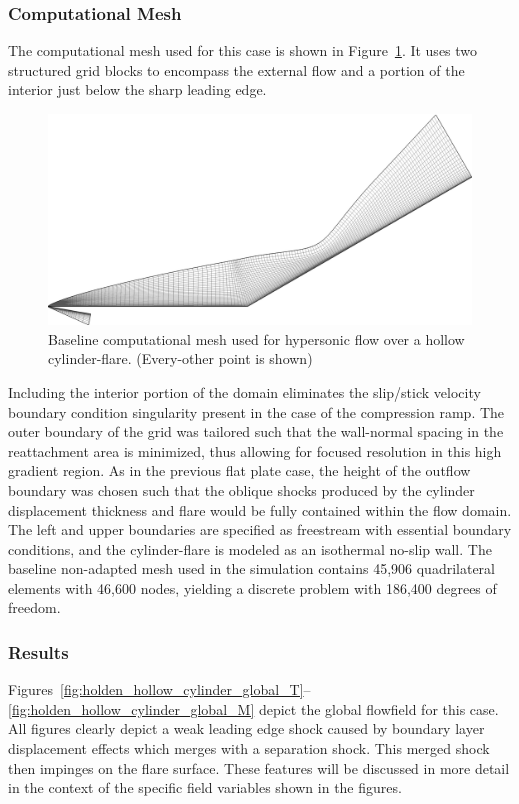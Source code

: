\subsubsection{Computational Mesh}
The computational mesh used for this case is shown in Figure~\ref{fig:holden_hollow_cylinder_mesh}.  It uses two structured grid blocks to encompass the external flow and a portion of the interior just below the sharp leading edge.
\begin{figure}[hbtp]
  \begin{center}
    \includegraphics[width=\textwidth]{figures/holden_hollow_cylinder/grid}
    \caption[Baseline computational mesh used for hypersonic flow over a hollow cylinder-flare.]{Baseline computational mesh used for hypersonic flow over a hollow cylinder-flare. (Every-other point is shown)\label{fig:holden_hollow_cylinder_mesh}}
  \end{center}
\end{figure}
Including the interior portion of the domain eliminates the slip/stick velocity boundary condition singularity present in the case of the compression ramp.
The outer boundary of the grid was tailored such that the wall-normal spacing in the reattachment area is minimized, thus allowing for focused resolution in this high gradient region.  As in the previous flat plate case, the height of the outflow boundary was chosen such that the oblique shocks produced by the cylinder displacement thickness and flare would be fully contained within the flow domain. The left and upper boundaries are specified as freestream with essential boundary conditions, and the cylinder-flare is modeled as an isothermal no-slip wall.  The baseline non-adapted mesh used in the simulation contains 45,906 quadrilateral elements with 46,600 nodes, yielding a discrete problem with 186,400 degrees of freedom.


\subsubsection{Results}
Figures~\ref{fig:holden_hollow_cylinder_global_T}--\ref{fig:holden_hollow_cylinder_global_M} depict the global flowfield for this case.  All figures clearly depict a weak leading edge shock caused by boundary layer displacement effects which merges with a separation shock.  This merged shock then impinges on the flare surface.  These features will be discussed in more detail in the context of the specific field variables shown in the figures.

